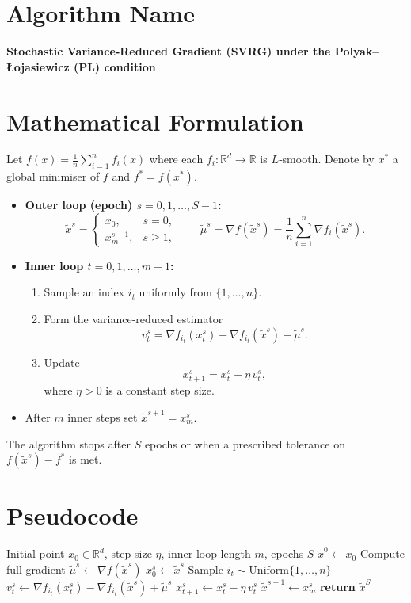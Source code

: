\documentclass[11pt]{article}
\newcommand{\R}{\mathbb{R}}
\begin{document}
\section*{Algorithm Name}
\textbf{Stochastic Variance‑Reduced Gradient (SVRG) under the Polyak–Łojasiewicz (PL) condition}

\section*{Mathematical Formulation}
Let $f(x)=\frac{1}{n}\sum_{i=1}^{n}f_i(x)$ where each $f_i:\R^d\to\R$ is $L$‑smooth.  
Denote by $x^{*}$ a global minimiser of $f$ and $f^{*}=f(x^{*})$.

\begin{itemize}
    \item \textbf{Outer loop (epoch) $s=0,1,\dots,S-1$:}
    \[
        \tilde{x}^{s}= \begin{cases}
            x_{0}, & s=0,\\
            x_{m}^{s-1}, & s\ge 1,
        \end{cases}
    \qquad
    \tilde{\mu}^{s}= \nabla f(\tilde{x}^{s})=\frac{1}{n}\sum_{i=1}^{n}\nabla f_i(\tilde{x}^{s}).
    \]
    \item \textbf{Inner loop $t=0,1,\dots,m-1$:}
    \begin{enumerate}[label=\arabic*.]
        \item Sample an index $i_t$ uniformly from $\{1,\dots,n\}$.
        \item Form the variance‑reduced estimator
        \[
            v_t^{s}= \nabla f_{i_t}(x_t^{s})-\nabla f_{i_t}(\tilde{x}^{s})+\tilde{\mu}^{s}.
        \]
        \item Update
        \[
            x_{t+1}^{s}= x_t^{s}-\eta\, v_t^{s},
        \]
        where $\eta>0$ is a constant step size.
    \end{enumerate}
    \item After $m$ inner steps set $\tilde{x}^{s+1}=x_{m}^{s}$.
\end{itemize}
The algorithm stops after $S$ epochs or when a prescribed tolerance on $f(\tilde{x}^{s})-f^{*}$ is met.

\section*{Pseudocode}
\begin{algorithm}[H]
\caption{SVRG with PL condition}
\begin{algorithmic}[1]
\Require Initial point $x_{0}\in\R^{d}$, step size $\eta$, inner loop length $m$, epochs $S$
\State $\tilde{x}^{0}\gets x_{0}$
    \State Compute full gradient $\tilde{\mu}^{s}\gets \nabla f(\tilde{x}^{s})$
    \State $x_{0}^{s}\gets \tilde{x}^{s}$
        \State Sample $i_t\sim\mathrm{Uniform}\{1,\dots,n\}$
        \State $v_t^{s}\gets \nabla f_{i_t}(x_{t}^{s})-\nabla f_{i_t}(\tilde{x}^{s})+\tilde{\mu}^{s}$
        \State $x_{t+1}^{s}\gets x_{t}^{s}-\eta\,v_t^{s}$
    \EndFor
    \State $\tilde{x}^{s+1}\gets x_{m}^{s}$
\EndFor
\State \textbf{return} $\tilde{x}^{S}$
\end{algorithmic}
\end{algorithm}
\end{document}
